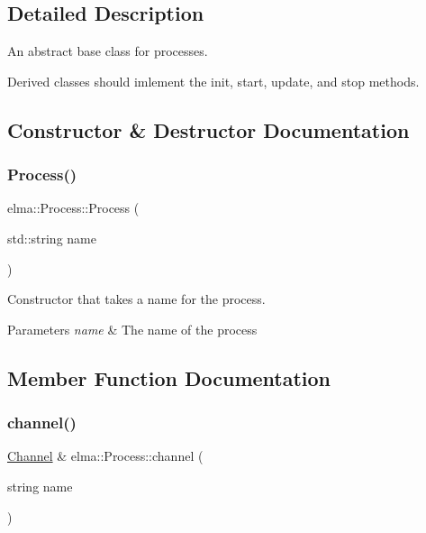 \subsection{Detailed Description}
An abstract base class for processes. 

Derived classes should imlement the init, start, update, and stop methods. 

\subsection{Constructor \& Destructor Documentation}
\mbox{\label{classelma_1_1_process_a4a29af963c350ce23ae8a91109affcf5}} 
\subsubsection{\texorpdfstring{Process()}{Process()}}
{\footnotesize\ttfamily elma\+::\+Process\+::\+Process (\begin{DoxyParamCaption}\item[{std\+::string}]{name }\end{DoxyParamCaption})\hspace{0.3cm}{\ttfamily [inline]}}



Constructor that takes a name for the process. 


\begin{DoxyParams}{Parameters}
{\em name} & The name of the process \\
\hline
\end{DoxyParams}


\subsection{Member Function Documentation}
\mbox{\label{classelma_1_1_process_ab392ade636276d047634df7605970164}} 
\subsubsection{\texorpdfstring{channel()}{channel()}}
{\footnotesize\ttfamily \mbox{\hyperlink{classelma_1_1_channel}{Channel}} \& elma\+::\+Process\+::channel (\begin{DoxyParamCaption}\item[{string}]{name }\end{DoxyParamCaption})}



